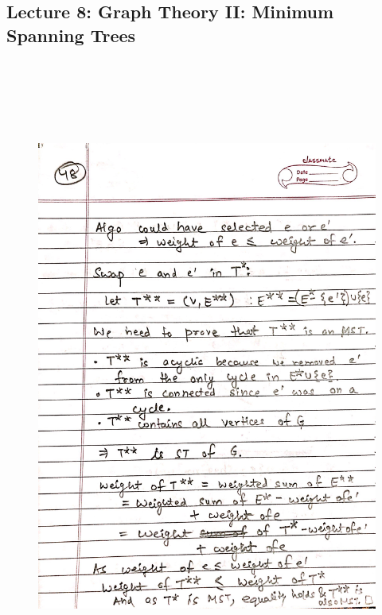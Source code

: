 \newpage
{\color{black} \subsection*{Lecture 8: Graph Theory II: Minimum Spanning Trees}}
\begin{figure}[H]
    \centering
    \includegraphics[width=16cm, height=21cm]{"./MIT-6.042J/MIT-6042J-048"}
\end{figure}

